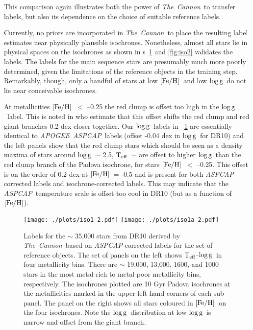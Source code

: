 \documentclass[12pt, preprint]{aastex}
\newcommand{\figurenames}{\figurename s}
\newcommand{\tc}{\textsl{The~Cannon}}
\newcommand{\apogee}{\textsl{APOGEE}}
\newcommand{\aspcap}{\textsl{ASPCAP}}
\newcommand{\teff}{\mbox{$\rm T_{eff}$}}
\newcommand{\feh}{\mbox{$\rm [Fe/H]$}}
\newcommand{\logg}{\mbox{$\rm \log g$}}
\begin{document}
This comparison again illustrates both the power of \tc\ to transfer labels, but also its dependence on the choice of suitable reference labels. 

Currently, no priors are incorporated in \tc\ to place the resulting label estimates near physically plausible isochrones. 
Nonetheless, almost all stars lie in physical spaces on the isochrones as shown in \figurenames~\ref{fig:iso} and \ref{fig:iso2} validates the labels. 
The labels for the main sequence stars are presumably much more poorly determined, given the limitations of the reference objects in the training step. 
Remarkably, though, only a handful of stars at low \feh\ and low \logg\ do not lie near conceivable isochrones. 

At metallicities \feh\ $<$ --0.25 the red clump is offset too high in the \logg\ label. This is noted in \citet{bovy2014} who estimate that this offset shifts the red clump and red giant branches 0.2 dex closer together. 
Our \logg\ labels in \figurename~\ref{fig:iso} are essentially identical to \apogee\ \aspcap\ labels (offset -0.04 dex in \logg\ for DR10) and the left panels show that the red clump stars which should be seen as a density maxima of stars around \logg\ $\sim$ 2.5, \teff\ $\sim$ 
are offset to higher \logg\ than the red clump branch of the Padova isochrone, for stars \feh\ $<$ --0.25. 
This offset is on the order of 0.2 dex at \feh\ = -0.5 and is present for both \aspcap-corrected labels and isochrone-corrected labels. 
This may indicate that the \aspcap\ temperature scale is offset too cool in DR10 (but as a function of \feh).

\begin{figure}[!h]
\centering
  \texttt{[image: ./plots/iso1\_2.pdf]}
  \hspace{-20pt}
    \texttt{[image: ./plots/iso1a\_2.pdf]}
\caption{Labels for the $\sim$ 35,000 stars from DR10 derived by \tc\ based on \aspcap-corrected labels for the set of reference objects. The set of panels on the left shows \teff-\logg\ in four metallicity bins. There are $\sim$ 19,000, 13,000, 1600, and 1000 stars in the most metal-rich to metal-poor metallicity bins, respectively. The isochrones plotted are 10 Gyr Padova isochrones at the metallicities marked in the upper left hand corners of each sub-panel.  The panel on the right shows all stars coloured in \feh\ on the four isochrones. Note the \logg\ distribution at low \logg\ is narrow and offset from the giant branch. }
\label{fig:iso}
\end{figure}
\end{document}
